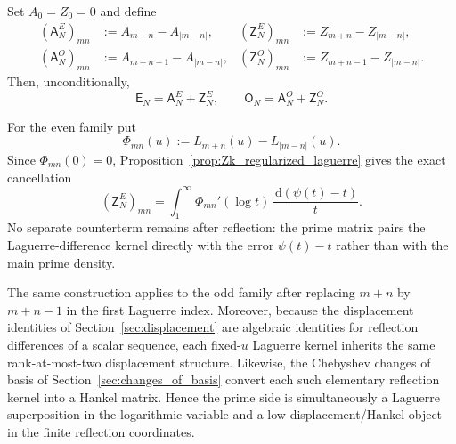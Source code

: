 \documentclass[11pt]{amsart}
\numberwithin{equation}{section}
\theoremstyle{plain}
\theoremstyle{definition}
\theoremstyle{remark}
\newcommand{\E}{\mathsf E}
\newcommand{\Omat}{\mathsf O}
\newcommand{\dd}{\,\mathrm d}
\begin{document}
Set $A_0=Z_0=0$ and define
\begin{align}
 (\mathsf A_N^E)_{mn}&:=A_{m+n}-A_{|m-n|},
 &
 (\mathsf Z_N^E)_{mn}&:=Z_{m+n}-Z_{|m-n|},
 \label{eq:E_arch_prime_matrices}\\
 (\mathsf A_N^O)_{mn}&:=A_{m+n-1}-A_{|m-n|},
 &
 (\mathsf Z_N^O)_{mn}&:=Z_{m+n-1}-Z_{|m-n|}.
 \label{eq:O_arch_prime_matrices}
\end{align}
Then, unconditionally,
\begin{equation}
 \E_N=\mathsf A_N^E+\mathsf Z_N^E,
 \qquad
 \Omat_N=\mathsf A_N^O+\mathsf Z_N^O.
 \label{eq:reflection_arch_prime_split}
\end{equation}

For the even family put
\begin{equation}
 \Phi_{mn}(u):=L_{m+n}(u)-L_{|m-n|}(u).
 \label{eq:Phi_mn_Laguerre_difference}
\end{equation}
Since $\Phi_{mn}(0)=0$, Proposition~\ref{prop:Zk_regularized_laguerre} gives the exact cancellation
\begin{equation}
 \boxed{
 (\mathsf Z_N^E)_{mn}
 =\int_{1^-}^{\infty}
 \Phi_{mn}'(\log t)\,\frac{\dd(\psi(t)-t)}{t}.}
 \label{eq:prime_matrix_PNT_error}
\end{equation}
No separate counterterm remains after reflection: the prime matrix pairs the Laguerre-difference kernel directly with the error $\psi(t)-t$ rather than with the main prime density.

The same construction applies to the odd family after replacing $m+n$ by $m+n-1$ in the first Laguerre index.  Moreover, because the displacement identities of Section~\ref{sec:displacement} are algebraic identities for reflection differences of a scalar sequence, each fixed-$u$ Laguerre kernel inherits the same rank-at-most-two displacement structure.  Likewise, the Chebyshev changes of basis of Section~\ref{sec:changes_of_basis} convert each such elementary reflection kernel into a Hankel matrix.  Hence the prime side is simultaneously a Laguerre superposition in the logarithmic variable and a low-displacement/Hankel object in the finite reflection coordinates.
\end{document}
